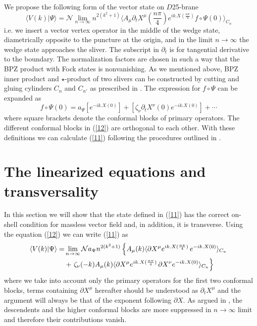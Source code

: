 \documentclass[a4paper,12pt]{article}
\begin{document}
We propose the following form of the vector state on $D$25-brane
\begin{equation}
\langle V(k)|\Psi\rangle=\mathcal{N}\lim_{n\to\infty} n^{2(k^2+1)}
\langle A_\mu\partial_t X^\mu(\frac{n\pi}{4}) e^{ik.X(\frac{n\pi}{4})}
f\circ\Psi(0)\rangle_{C_n} 
\label{11}
\end{equation}
i.e. we insert a vector vertex operator in the middle of the wedge state,
diametrically opposite to the puncture at the origin, and in the limit
$n\to\infty$ the wedge state approaches the sliver. The subscript in 
$\partial_t$ is for tangential derivative to the boundary. 
The normalization factors are chosen in such a way that the BPZ product 
with Fock states is nonvanishing.
As we mentioned above, BPZ inner product and $\star$-product of two slivers
can be constructed by cutting and gluing cylinders $C_n$ and $C_{n'}$ as
prescribed in \cite{rsz3,rsz}. The expression for $f\circ\Psi$ can be
expanded as 
\begin{equation}
f\circ\Psi(0)=a_\Psi \left[ e^{-ik.X(0)}\right]+
\left[\zeta_\nu \partial_t X^\nu(0) e^{-ik.X(0)}\right] + \cdots
\label{12}
\end{equation}
where square brackets denote the conformal blocks of primary
operators. The different conformal blocks in (\ref{12}) are orthogonal
to each other. With these definitions we can calculate
(\ref{11}) following the procedures outlined in \cite{rsz4,rv}.

\section{The linearized equations and transversality}

In this section we will show that the state defined in (\ref{11}) 
has the correct on-shell condition for massless vector field and, in addition,
it is transverse. Using the equation (\ref{12}) we can write (\ref{11}) as
\begin{align}
\langle V(k)|\Psi\rangle=&\lim_{n\to\infty}\mathcal{N}a_\Psi n^{2(k^2+1)}
\left\{
A_\mu(k)\langle\partial X^\mu e^{ik.X(\frac{n\pi}{4})}
\,e^{-ik.X(0)} \rangle_{C_n} \right. \notag \\
&+\left. \zeta_\nu(-k)A_\mu(k)
\langle\partial X^\mu e^{ik.X(\frac{n\pi}{4})}
\,\partial X^\nu e^{-ik.X(0)} \rangle_{C_n} \right\}
\label{13}
\end{align}
where we take into account only the primary operators for the first two
conformal blocks, terms containing $\partial X^\mu$ hereafter should be 
understood as $\partial_t X^\mu$ and the argument will always be that 
of the exponent following $\partial X$.  As argued in \cite{rsz3}, the 
descendents and the higher conformal blocks are more suppressed in 
$n\to\infty$ limit and therefore their contributions vanish.
\end{document}
